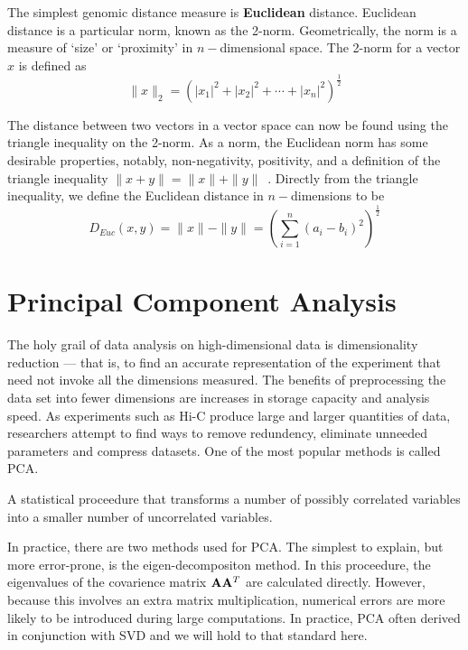 The simplest genomic distance measure is \textbf{Euclidean} distance.  Euclidean distance is a particular \gls{norm}, known as
the 2-norm.  Geometrically, the norm is a measure of `size' or `proximity' in $n-$dimensional space.  The 2-norm for a vector $x$ is
defined as
\[
  \|x\|_{2} = {(|x_1|^2 + |x_2|^2 + \cdots + |x_n|^2)}^{\frac{1}{2}}
\]

The distance between two vectors in a vector space can now be found using the triangle inequality on the 2-norm.  As a norm, the Euclidean
norm has some desirable properties, notably, non-negativity, positivity, and a definition of the triangle inequality
$\|x + y\| = \|x\| + \|y\|$~\cite{horn2013}.  Directly from the triangle inequality, we define the Euclidean distance in $n-$dimensions to
be
\[
  D_{Euc}(x,y) = \|x\| - \|y\| = {(\sum_{i = 1}^{n}{(a_i - b_i)}^2)}^{\frac{1}{2}}
\]


\section*{Principal Component Analysis}

The holy grail of data analysis on high-dimensional data is dimensionality reduction --- that is, to find an accurate representation of
the experiment that need not invoke all the dimensions measured.  The benefits of preprocessing the data set into fewer dimensions are
increases in storage capacity and analysis speed.  As experiments such as Hi-C produce large and larger quantities of data, researchers
attempt to find ways to remove redundency, eliminate unneeded parameters and compress datasets.  One of the most popular methods is
called \gls{PCA}\cite{law1987}.

\begin{defn}
  A statistical proceedure that transforms a number of possibly correlated variables into a smaller number of uncorrelated variables.
\end{defn}

In practice, there are two methods used for \gls{PCA}.  The simplest to explain, but more error-prone, is the eigen-decompositon
method\cite{}.  In this proceedure, the eigenvalues of the covarience matrix $\mathbf{A}\mathbf{A}^T$ are calculated directly.  However,
because this involves an extra matrix multiplication, numerical errors are more likely to be introduced during large computations.
In practice, \gls{PCA} often derived in conjunction with \gls{SVD} and we will hold to that standard here.

